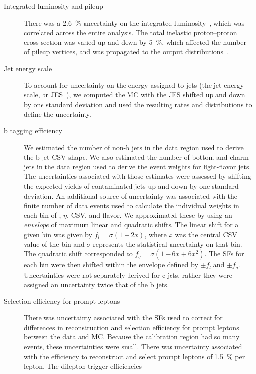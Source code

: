 \begin{description}
  \item[Integrated luminosity and pileup] There was a \SI{2.6}{\percent}
    uncertainty on the integrated luminosity~\cite{CMS-PAS-LUM-13-001}, which
    was
    correlated across the entire analysis. The total inelastic proton--proton
    cross section was varied up and down by \SI{5}{\percent}, which affected the
    number of pileup vertices, and was propagated to the output
    distributions~\cite{tagkey20135}.
  \item[Jet energy scale] To account for uncertainty on the energy assigned to
    jets (the jet energy scale, or JES~\cite{cmsJEC}), we computed the MC with
    the JES shifted up and down by one standard deviation and used the resulting
    rates and distributions to define the uncertainty.
  \item[b tagging efficiency] We estimated the number of non-b jets in the data
    region used to derive the b jet CSV shape. We also estimated the number of bottom and
    charm jets in the data region used to derive the event weights for
    light-flavor jets. The uncertainties associated with those estimates were
    assessed by shifting the expected yields of contaminated jets up and down by
    one standard deviation. An additional source of uncertainty was associated
    with the finite number of data events used to calculate the individual
    weights in each bin of \pT, $\eta$, CSV, and flavor. We approximated these
    by
    using an \emph{envelope} of maximum linear and quadratic shifts. The linear
    shift for a given bin was given by $f_l = \sigma (1 - 2x)$, where $x$ was the
    central CSV value of the bin and $\sigma$ represents the statistical
    uncertainty on that bin. The quadratic shift corresponded to $f_q = \sigma (1
    - 6x + 6x^2)$. The SFs for each bin were then shifted within the envelope
    defined by $\pm f_l$ and $\pm f_q$. Uncertainties were not separately derived
    for c jets, rather they were assigned an uncertainty twice that of the b
    jets.
  \item[Selection efficiency for prompt leptons] There was uncertainty associated
    with the SFs used to correct for differences in reconstruction and selection
    efficiency for prompt leptons between the data and MC. Because the calibration
    region had so many events, these uncertainties were small. There was
    uncertainty associated with the efficiency to reconstruct and select prompt
    leptons of \SI{1.5}{\percent} per lepton. The dilepton trigger efficiencies

\end{description}
